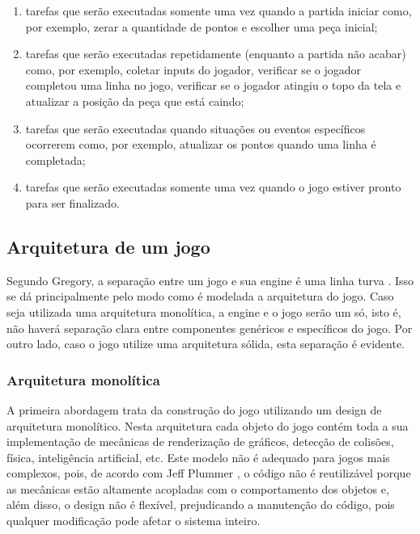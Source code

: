 \begin{enumerate}
\item tarefas que serão executadas somente uma vez quando a partida iniciar como, por exemplo, zerar a quantidade de pontos e escolher uma peça inicial;
\item tarefas que serão executadas repetidamente (enquanto a partida não acabar) como, por exemplo, coletar inputs do jogador, verificar se o jogador completou uma linha no jogo, verificar se o jogador atingiu o topo da tela e atualizar a posição da peça que está caindo;
\item tarefas que serão executadas quando situações ou eventos específicos ocorrerem como, por exemplo, atualizar os pontos quando uma linha é completada;
\item tarefas que serão executadas somente uma vez quando o jogo estiver pronto para ser finalizado.
\end{enumerate}

\subsection{Arquitetura de um jogo}

Segundo Gregory, a separação entre um jogo e sua engine é uma linha turva \cite{gregory2014game}. Isso se dá principalmente pelo modo como é modelada a arquitetura do jogo. Caso seja utilizada uma arquitetura monolítica, a engine e o jogo serão um só, isto é, não haverá separação clara entre componentes genéricos e específicos do jogo. Por outro lado, caso o jogo utilize uma arquitetura sólida, esta separação é evidente.

\subsubsection{Arquitetura monolítica}

A primeira abordagem trata da construção do jogo utilizando um design de arquitetura monolítico. Nesta arquitetura cada objeto do jogo contém toda a sua implementação de mecânicas de renderização de gráficos, detecção de colisões, física, inteligência artificial, etc. Este modelo não é adequado para jogos mais complexos, pois, de acordo com Jeff Plummer \cite{jeffthesis}, o código não é reutilizável porque as mecânicas estão altamente acopladas com o comportamento dos objetos e, além disso, o design não é flexível, prejudicando a manutenção do código, pois qualquer modificação pode afetar o sistema inteiro.

